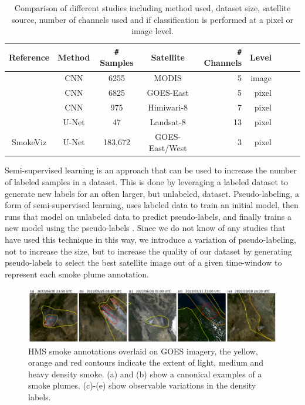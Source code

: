 \begin{table}[h]
    \caption{Comparison of different studies including method used, dataset size, satellite source, number of channels used and if classification is performed at a pixel or image level.}\label{studies}
    \centering
    \begin{tabular}{ccccrrcrc}
        \toprule
        Reference & Method & \verb|#| Samples & Satellite & \verb|#| Channels & Level\\
        \midrule
        \cite{smokenet}& CNN & 6255 & MODIS & 5 & image\\
        \cite{smoke_goes}& CNN & 6825 & GOES-East & 5 & pixel\\
        \cite{larsen} & CNN & 975 & Himiwari-8 & 7 & pixel\\
        \cite{wang}& U-Net & 47 & Landsat-8 & 13 & pixel\\
        SmokeViz  & U-Net & 183,672 & GOES-East/West & 3 & pixel\\
        \bottomrule
    \end{tabular}
\end{table}

Semi-supervised learning is an approach that can be used to increase the number of labeled samples in a dataset. This is done by leveraging a labeled dataset to generate new labels for an often larger, but unlabeled, dataset. Pseudo-labeling, a form of semi-supervised learning, uses labeled data to train an initial model, then runs that model on unlabeled data to predict pseudo-labels, and finally trains a new model using the pseudo-labels \cite{pseudo}. Since we do not know of any studies that have used this technique in this way, we introduce a variation of pseudo-labeling, not to increase the size, but to increase the quality of our dataset by generating pseudo-labels to select the best satellite image out of a given time-window to represent each smoke plume annotation.

\begin{figure}
    \centering
    \includegraphics[width=\linewidth]{figures/variations2.png}
    \caption{HMS smoke annotations overlaid on GOES imagery, the yellow, orange and red contours indicate the extent of light, medium and heavy density smoke. (a) and (b) show a canonical examples of a smoke plumes. (c)-(e) show observable variations in the density labels.}\label{densities}
\end{figure}

